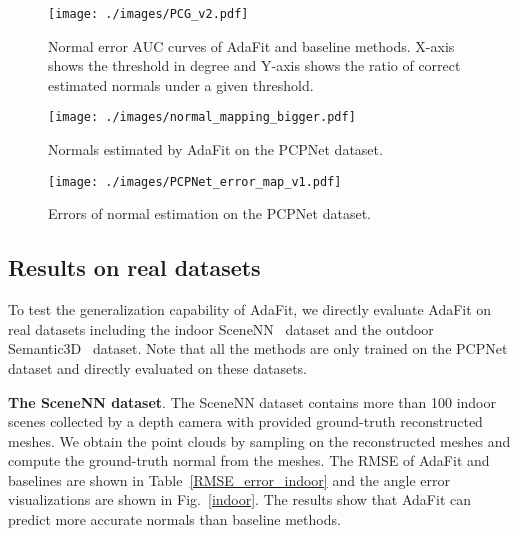 \begin{figure}[]
\begin{center}
\texttt{[image: ./images/PCG\_v2.pdf]}\vspace{-0.5cm}
\end{center}
   \caption{Normal error AUC curves of AdaFit and baseline methods. X-axis shows the threshold in degree and Y-axis shows the ratio of correct estimated normals under a given threshold.}
\label{fig:PCG}
\vspace{-0.4cm}
\end{figure}

\begin{figure}[]
\begin{center}
\texttt{[image: ./images/normal\_mapping\_bigger.pdf]}\vspace{-0.3cm}

\end{center}
   \caption{Normals estimated by AdaFit on the PCPNet dataset.}
\label{fig:normal-map}
\vspace{-0.2cm}

\end{figure}

\begin{figure}[]
\begin{center}
\texttt{[image: ./images/PCPNet\_error\_map\_v1.pdf]}\vspace{-0.5cm}
\end{center}
   \caption{Errors of normal estimation on the PCPNet dataset.}
   
\label{fig:normal-error}
\end{figure}


\subsection {Results on real datasets}
\label{Transfer-new}

To test the generalization capability of AdaFit, we directly evaluate AdaFit on real datasets including the indoor SceneNN~\cite{hua2016scenenn} dataset and the outdoor Semantic3D~\cite{hackel2017isprs} dataset. Note that all the methods are only trained on the PCPNet dataset and directly evaluated on these datasets.

\textbf{The SceneNN dataset}. 
The SceneNN dataset contains more than 100 indoor scenes collected by a depth camera with provided ground-truth reconstructed meshes. We obtain the point clouds by sampling on the reconstructed meshes and compute the ground-truth normal from the meshes. The RMSE of AdaFit and baselines are shown in Table~\ref{RMSE_error_indoor} and the angle error visualizations are shown in Fig.~\ref{indoor}. The results show that AdaFit can predict more accurate normals than baseline methods.

